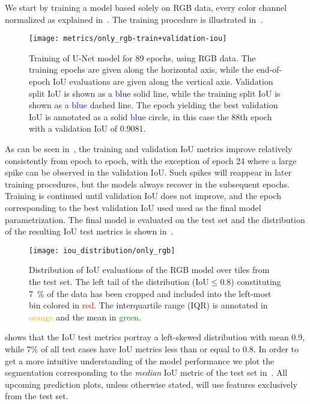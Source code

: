 We start by training a model based solely on RGB data, every color channel normalized as explained in~.
The training procedure is illustrated in~.

\begin{figure}[H]
  \centering
  \texttt{[image: metrics/only\_rgb-train+validation-iou]}
  \caption{%
    Training of U-Net model for 89 epochs, using RGB data.
    The training epochs are given along the horizontal axis, while the end-of-epoch IoU evaluations are given along the vertical axis.
    Validation split IoU is shown as a \textcolor{blue}{blue} solid line, while the training split IoU is shown as a \textcolor{blue}{blue} dashed line.
    The epoch yielding the best validation IoU is annotated as a solid \textcolor{blue}{blue} circle, in this case the 88th epoch with a validation IoU of \num{0.9081}.
  }%
  \label{fig:rgb-training}
\end{figure}

As can be seen in~, the training and validation IoU metrics improve relatively consistently from epoch to epoch, with the exception of epoch 24 where a large spike can be observed in the validation IoU.
Such spikes will reappear in later training procedures, but the models always recover in the subsequent epochs.
Training is continued until validation IoU does not improve, and the epoch corresponding to the best validation IoU used used as the final model parametrization.
The final model is evaluated on the test set and the distribution of the resulting IoU test metrics is shown in~.

\begin{figure}[H]
  \centering
  \texttt{[image: iou\_distribution/only\_rgb]}
  \caption{%
    Distribution of IoU evaluations of the RGB model over tiles from the test set.
    The left tail of the distribution ($\mathrm{IoU} \leq 0.8$) constituting \SI{7}{\percent} of the data has been cropped and included into the left-most bin colored in \textcolor{red}{red}.
    The interquartile range (IQR) is annotated in \textcolor{orange}{orange} and the mean in \textcolor{green}{green}.
  }%
  \label{fig:rgb-model-test}\label{fig:iou-distribution-explanation}
\end{figure}

 shows that the IoU test metrics portray a left-skewed distribution with mean 0.9, while 7\% of all test cases have IoU metrics less than or equal to 0.8. %
In order to get a more intuitive understanding of the model performance we plot the segmentation corresponding to the \textit{median} IoU metric of the test set in~.
All upcoming prediction plots, unless otherwise stated, will use features exclusively from the test set.

